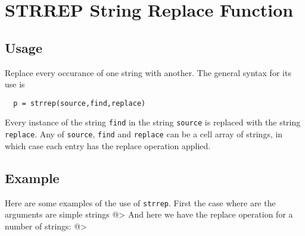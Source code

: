 \section{STRREP String Replace Function}

\subsection{Usage}

Replace every occurance of one string with another.  The
general syntax for its use is
\begin{verbatim}
  p = strrep(source,find,replace)
\end{verbatim}
Every instance of the string \verb|find| in the string \verb|source| is
replaced with the string \verb|replace|.  Any of \verb|source|, \verb|find|
and \verb|replace| can be a cell array of strings, in which case
each entry has the replace operation applied.
\subsection{Example}

Here are some examples of the use of \verb|strrep|.  First the case
where are the arguments are simple strings
@>
And here we have the replace operation for a number of strings:
@>
